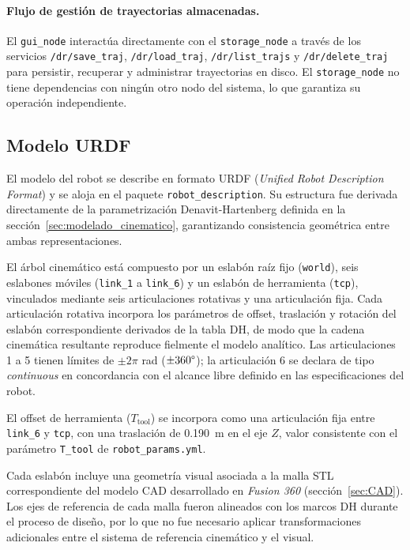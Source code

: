\documentclass{article}
\begin{document}
\paragraph{Flujo de gestión de trayectorias almacenadas.}
\begin{sloppypar}
El \texttt{gui\_node} interactúa directamente con el \texttt{storage\_node} a través de los servicios \texttt{/dr/save\_traj}, \texttt{/dr/load\_traj}, \texttt{/dr/list\_trajs} y \texttt{/dr/delete\_traj} para persistir, recuperar y administrar trayectorias en disco. El \texttt{storage\_node} no tiene dependencias con ningún otro nodo del sistema, lo que garantiza su operación independiente.
\end{sloppypar}

\subsection{Modelo URDF}
\label{sec:ros2_urdf}

El modelo del robot se describe en formato URDF (\textit{Unified Robot Description Format}) y se aloja en el paquete \texttt{robot\_description}. Su estructura fue derivada directamente de la parametrización Denavit-Hartenberg definida en la sección~\ref{sec:modelado_cinematico}, garantizando consistencia geométrica entre ambas representaciones.

El árbol cinemático está compuesto por un eslabón raíz fijo (\texttt{world}), seis eslabones móviles (\texttt{link\_1} a \texttt{link\_6}) y un eslabón de herramienta (\texttt{tcp}), vinculados mediante seis articulaciones rotativas y una articulación fija. Cada articulación rotativa incorpora los parámetros de offset, traslación y rotación del eslabón correspondiente derivados de la tabla DH, de modo que la cadena cinemática resultante reproduce fielmente el modelo analítico. Las articulaciones 1 a 5 tienen límites de $\pm 2\pi$ rad ($\pm 360\degree$); la articulación 6 se declara de tipo \textit{continuous} en concordancia con el alcance libre definido en las especificaciones del robot.

El offset de herramienta ($T_{\text{tool}}$) se incorpora como una articulación fija entre \texttt{link\_6} y \texttt{tcp}, con una traslación de 0.190~m en el eje $Z$, valor consistente con el parámetro \texttt{T\_tool} de \texttt{robot\_params.yml}.

Cada eslabón incluye una geometría visual asociada a la malla STL correspondiente del modelo CAD desarrollado en \textit{Fusion 360} (sección~\ref{sec:CAD}). Los ejes de referencia de cada malla fueron alineados con los marcos DH durante el proceso de diseño, por lo que no fue necesario aplicar transformaciones adicionales entre el sistema de referencia cinemático y el visual.
\end{document}
